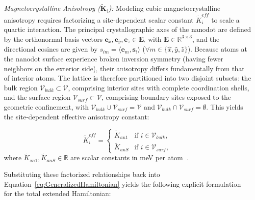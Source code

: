 \documentclass[final,5p,times,twocolumn]{elsarticle}
\begin{document}
\emph{Magnetocrystalline Anisotropy ($\tilde{\mathbf{K}}_i$):} Modeling cubic magnetocrystalline anisotropy requires factorizing a site-dependent scalar constant $\tilde{K}_i^{eff}$ to scale a quartic interaction. The principal crystallographic axes of the nanodot are defined by the orthonormal basis vectors $\mathbf{e}_{\hat{x}}, \mathbf{e}_{\hat{y}}, \mathbf{e}_{\hat{z}} \in \mathbf{E}$, with $\mathbf{E} \in \mathbb{R}^{3 \times 3}$, and the directional cosines are given by $s_{im} = \langle \mathbf{e}_m,\mathbf{s}_i\rangle$ ($\forall m\in\{\hat{x},\hat{y},\hat{z}\}$). Because atoms at the nanodot surface experience broken inversion symmetry (having fewer neighbors on the exterior side), their anisotropy differs fundamentally from that of interior atoms. The lattice is therefore partitioned into two disjoint subsets: the bulk region $\mathcal{V}_{bulk} \subset \mathcal{V}$, comprising interior sites with complete coordination shells, and the surface region $\mathcal{V}_{surf} \subset \mathcal{V}$, comprising boundary sites exposed to the geometric confinement, with $\mathcal{V}_{bulk} \cup \mathcal{V}_{surf} = \mathcal{V}$ and $\mathcal{V}_{bulk} \cap \mathcal{V}_{surf} = \emptyset$. This yields the site-dependent effective anisotropy constant:
    
\begin{equation}\label{eq:AnisotropyEffective}
    \tilde{K}_i^{eff} = 
    \begin{cases}
        \tilde{K}_{an1} & \text{if } i \in \mathcal{V}_{bulk}, \\
        \tilde{K}_{anS} & \text{if } i \in \mathcal{V}_{surf},
    \end{cases}
\end{equation}
where $\tilde{K}_{an1}, \tilde{K}_{anS} \in \mathbb{R}$ are scalar constants in meV per atom~\cite{cullity2011introduction}.


Substituting these factorized relationships back into 
Equation~\ref{eq:GeneralizedHamiltonian} yields the following explicit formulation for the total extended Hamiltonian:
\end{document}
